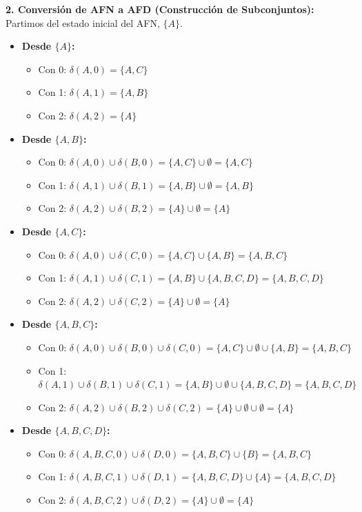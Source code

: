 \documentclass[12pt]{article}
\begin{document}
\vspace{0.5cm}

\textbf{2. Conversión de AFN a AFD (Construcción de Subconjuntos):} \\
Partimos del estado inicial del AFN, $\{A\}$.
\begin{itemize}
    \item \textbf{Desde $\{A\}$:} 
    \begin{itemize}
        \item Con 0: $\delta(A, 0) = \{A, C\}$
        \item Con 1: $\delta(A, 1) = \{A, B\}$
        \item Con 2: $\delta(A, 2) = \{A\}$
    \end{itemize}
    \item \textbf{Desde $\{A, B\}$:}
    \begin{itemize}
        \item Con 0: $\delta(A, 0) \cup \delta(B, 0) = \{A, C\} \cup \emptyset = \{A, C\}$
        \item Con 1: $\delta(A, 1) \cup \delta(B, 1) = \{A, B\} \cup \emptyset = \{A, B\}$
        \item Con 2: $\delta(A, 2) \cup \delta(B, 2) = \{A\} \cup \emptyset = \{A\}$
    \end{itemize}
    \item \textbf{Desde $\{A, C\}$:}
    \begin{itemize}
        \item Con 0: $\delta(A, 0) \cup \delta(C, 0) = \{A, C\} \cup \{A, B\} = \{A, B, C\}$
        \item Con 1: $\delta(A, 1) \cup \delta(C, 1) = \{A, B\} \cup \{A, B, C, D\} = \{A, B, C, D\}$
        \item Con 2: $\delta(A, 2) \cup \delta(C, 2) = \{A\} \cup \emptyset = \{A\}$
    \end{itemize}
    \item \textbf{Desde $\{A, B, C\}$:}
    \begin{itemize}
        \item Con 0: $\delta(A, 0) \cup \delta(B, 0) \cup \delta(C, 0) = \{A, C\} \cup \emptyset \cup \{A, B\} = \{A, B, C\}$
        \item Con 1: $\delta(A, 1) \cup \delta(B, 1) \cup \delta(C, 1) = \{A, B\} \cup \emptyset \cup \{A, B, C, D\} = \{A, B, C, D\}$
        \item Con 2: $\delta(A, 2) \cup \delta(B, 2) \cup \delta(C, 2) = \{A\} \cup \emptyset \cup \emptyset = \{A\}$
    \end{itemize}
    \item \textbf{Desde $\{A, B, C, D\}$:}
    \begin{itemize}
        \item Con 0: $\delta(A,B,C,0) \cup \delta(D, 0) = \{A, B, C\} \cup \{B\} = \{A, B, C\}$
        \item Con 1: $\delta(A,B,C,1) \cup \delta(D, 1) = \{A, B, C, D\} \cup \{A\} = \{A, B, C, D\}$
        \item Con 2: $\delta(A,B,C,2) \cup \delta(D, 2) = \{A\} \cup \emptyset = \{A\}$
    \end{itemize}
\end{itemize}
\end{document}
